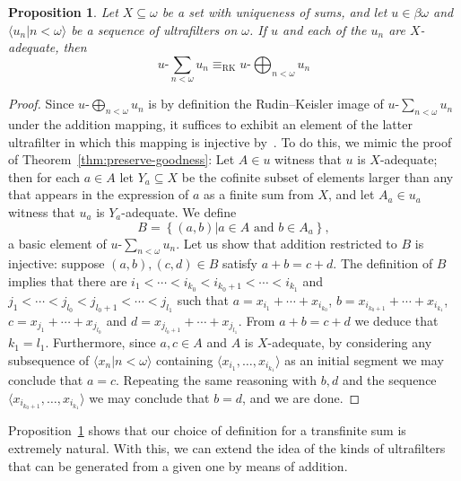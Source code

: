 \documentclass[10pt]{amsart}
\newcommand{\usum}[2]{#1\text{-}\sum_{#2<\omega}}
\newcommand{\uadd}[2]{#1\text{-}\bigoplus_{#2<\omega}}
\newcommand{\eqrk}[2]{#1\equiv_{\mathrm{RK}}#2}
\newtheorem{proposition}[theorem]{Proposition}
\theoremstyle{definition}
\theoremstyle{remark}
\begin{document}
\begin{proposition}\label{prop:goodnessimpliesrkequiv}
    Let $X\subseteq\omega$ be a set with uniqueness of sums, and let $u\in\beta\omega$ and $\langle u_n\big|n<\omega\rangle$ be a sequence of ultrafilters on $\omega$. If $u$ and each of the $u_n$ are $X$-adequate, then
    \begin{equation*}
        \eqrk{\usum{u}{n}u_n}{\uadd{u}{n}u_n}
    \end{equation*}
\end{proposition}
\begin{proof}
    Since $\uadd{u}{n}u_n$ is by definition the Rudin--Keisler image of $\usum{u}{n}u_n$ under the addition mapping, it suffices to exhibit an element of the latter ultrafilter in which this mapping is injective by~\cite[Theorem 8.17]{hindman-strauss}. To do this, we mimic the proof of Theorem~\ref{thm:preserve-goodness}: Let $A\in u$ witness that $u$ is $X$-adequate; then for each $a\in A$ let $Y_a\subseteq X$ be the cofinite subset of elements larger than any that appears in the expression of $a$ as a finite sum from $X$, and let $A_a\in u_a$ witness that $u_a$ is $Y_a$-adequate. We define 
    \begin{equation*}
        B=\left\{(a,b)\big|a\in A\text{ and }b\in A_a\right\},
    \end{equation*}
    a basic element of $\usum{u}{n}u_n$. Let us show that addition restricted to $B$ is injective: suppose $(a,b),(c,d)\in B$ satisfy $a+b=c+d$. The definition of $B$ implies that there are $i_1<\cdots<i_{k_0}<i_{k_0+1}<\cdots<i_{k_1}$ and $j_1<\cdots<j_{l_0}<j_{l_0+1}<\cdots<j_{l_1}$ such that $a=x_{i_1}+\cdots+x_{i_{k_0}}$, $b=x_{i_{k_0 + 1}}+\cdots+x_{i_{k_1}}$, $c=x_{j_1}+\cdots+x_{j_{l_0}}$ and $d=x_{j_{l_0 +1}}+\cdots+x_{j_{l_1}}$. From $a+b=c+d$ we deduce that $k_1=l_1$. Furthermore, since $a,c\in A$ and $A$ is $X$-adequate, by considering any subsequence of $\langle x_n\big|n<\omega\rangle$ containing $\langle x_{i_1},\ldots,x_{i_{k_1}}\rangle$ as an initial segment we may conclude that $a=c$. Repeating the same reasoning with $b,d$ and the sequence $\langle x_{i_{k_0 + 1}},\ldots,x_{i_{k_1}}\rangle$ we may conclude that $b=d$, and we are done.
\end{proof}

Proposition~\ref{prop:goodnessimpliesrkequiv} shows that our choice of definition for a transfinite sum is extremely natural. With this, we can extend the idea of the kinds of ultrafilters that can be generated from a given one by means of addition.
\end{document}
